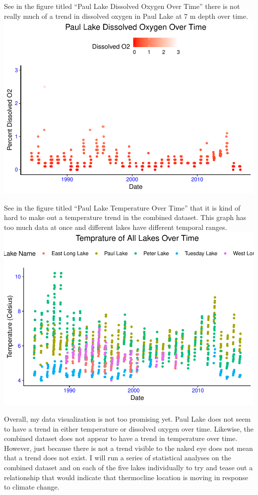 \documentclass[12pt,]{article}
\begin{document}
See in the figure titled ``Paul Lake Dissolved Oxygen Over Time'' there
is not really much of a trend in dissolved oxygen in Paul Lake at 7 m
depth over time.
\includegraphics{KeithBollt_ENV872_FinalProject_files/figure-latex/visualization4-1.pdf}

See in the figure titled ``Paul Lake Temperature Over Time'' that it is
kind of hard to make out a temperature trend in the combined dataset.
This graph has too much data at once and different lakes have different
temporal ranges.
\includegraphics{KeithBollt_ENV872_FinalProject_files/figure-latex/visualization5-1.pdf}

Overall, my data visualization is not too promising yet. Paul Lake does
not seem to have a trend in either temperature or dissolved oxygen over
time. Likewise, the combined dataset does not appear to have a trend in
temperature over time. However, just because there is not a trend
visible to the naked eye does not mean that a trend does not exist. I
will run a series of statistical analyses on the combined dataset and on
each of the five lakes individually to try and tease out a relationship
that would indicate that thermocline location is moving in response to
climate change.
\end{document}
